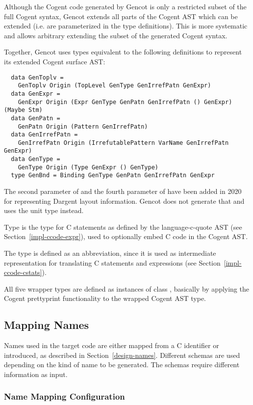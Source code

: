Although the Cogent code generated by Gencot is only a restricted subset of the full Cogent syntax, Gencot extends all parts 
of the Cogent AST which can be extended (i.e. are parameterized in the type definitions). This is more systematic and 
allows arbitrary extending the subset of the generated Cogent syntax.

Together, Gencot uses types equivalent to the following definitions to represent its extended Cogent surface AST:
\begin{verbatim}
  data GenToplv =
    GenToplv Origin (TopLevel GenType GenIrrefPatn GenExpr)
  data GenExpr =
    GenExpr Origin (Expr GenType GenPatn GenIrrefPatn () GenExpr) (Maybe Stm)
  data GenPatn =
    GenPatn Origin (Pattern GenIrrefPatn)
  data GenIrrefPatn = 
    GenIrrefPatn Origin (IrrefutablePattern VarName GenIrrefPatn GenExpr)
  data GenType = 
    GenType Origin (Type GenExpr () GenType)
  type GenBnd = Binding GenType GenPatn GenIrrefPatn GenExpr
\end{verbatim}
The second parameter of  and the fourth parameter of  have been added in 2020 for representing 
Dargent layout information. Gencot does not generate that and uses the unit type instead.

Type  is the type for C statements as defined by the language-c-quote AST 
(see Section~\ref{impl-ccode-expr}), used to optionally embed C code in the Cogent AST.

The type  is defined as an abbreviation, since it is used as intermediate representation for translating 
C statements and expressions (see Section~\ref{impl-ccode-cstats}).

All five wrapper types are defined as instances of class , basically by applying the Cogent prettyprint
functionality to the wrapped Cogent AST type.

\subsection{Mapping Names}
\label{impl-ccode-names}

Names used in the target code are either mapped from a C identifier or introduced, as described in 
Section~\ref{design-names}. Different schemas are used depending on the kind of name to be generated.
The schemas require different information as input.

\subsubsection{Name Mapping Configuration}

